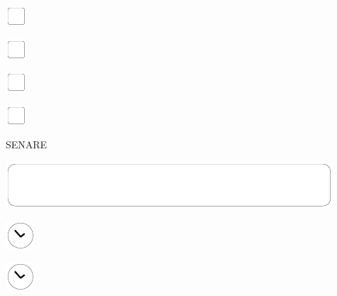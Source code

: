 \documentclass[11pt,titlepage]{article}
\begin{document}
\vspace{10mm}

\noindent
\includegraphics[]{checkbox-4mm.pdf}

\vspace{10mm}

\noindent
\includegraphics[]{checkbox-4mm.pdf}

\vspace{10mm}

\noindent
\includegraphics[]{checkbox-4mm.pdf}

\vspace{10mm}

\noindent
\includegraphics[]{checkbox-4mm.pdf}

\pagebreak

\small %
\hfill SENARE

\vspace{6mm}

\noindent
\includegraphics[]{mediumbox.pdf}

\vspace{15mm}

\noindent
\hspace{1mm}\includegraphics[]{clockface.pdf}

\vspace{10,5mm}

\noindent
\hspace{1mm}\includegraphics[]{clockface.pdf}
\end{document}
